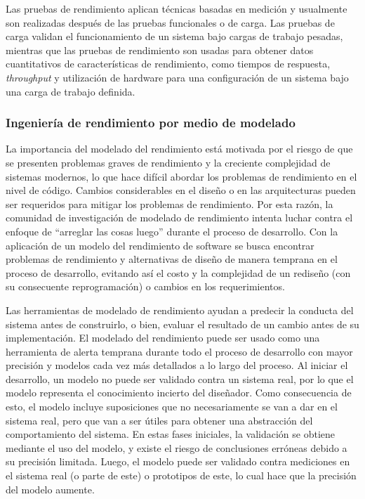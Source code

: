 Las pruebas de rendimiento aplican técnicas basadas en medición y usualmente son realizadas después de las pruebas funcionales o de carga. Las pruebas de carga validan el funcionamiento de un sistema bajo cargas de trabajo pesadas, mientras que las pruebas de rendimiento son usadas para obtener datos cuantitativos de características de rendimiento, como tiempos de respuesta, \emph{throughput} y utilización de hardware para una configuración de un sistema bajo una carga de trabajo definida.

\subsubsection{Ingeniería de rendimiento por medio de modelado} 
La importancia del modelado del rendimiento está motivada por el riesgo de que se presenten problemas graves de rendimiento y la creciente complejidad de sistemas modernos, lo que hace difícil abordar los problemas de rendimiento en el nivel de código\cite{Reussner:2016:MSS:3036121}. Cambios considerables en el diseño o en las arquitecturas pueden ser requeridos para mitigar los problemas de rendimiento. Por esta razón, la comunidad de investigación de modelado de rendimiento intenta luchar contra el enfoque de ``arreglar las cosas luego'' durante el proceso de desarrollo. Con la aplicación de un modelo del rendimiento de software se busca encontrar problemas de rendimiento y alternativas de diseño de manera temprana en el proceso de desarrollo, evitando así el costo y la complejidad de un rediseño (con su consecuente reprogramación) o cambios en los requerimientos.

Las herramientas de modelado de rendimiento ayudan a predecir la conducta del sistema antes de construirlo, o bien, evaluar el resultado de un cambio antes de su implementación. El modelado del rendimiento puede ser usado como una herramienta de alerta temprana durante todo el proceso de desarrollo con mayor precisión y modelos cada vez más detallados a lo largo del proceso. Al iniciar el desarrollo, un modelo no puede ser validado contra un sistema real, por lo que el modelo representa el conocimiento incierto del diseñador. Como consecuencia de esto, el modelo incluye suposiciones que no necesariamente se van a dar en el sistema real, pero que van a ser útiles para obtener una abstracción del comportamiento del sistema. En estas fases iniciales, la validación se obtiene mediante el uso del modelo, y existe el riesgo de conclusiones erróneas debido a su precisión limitada. Luego, el modelo puede ser validado contra mediciones en el sistema real (o parte de este) o prototipos de este, lo cual hace que la precisión del modelo aumente.

